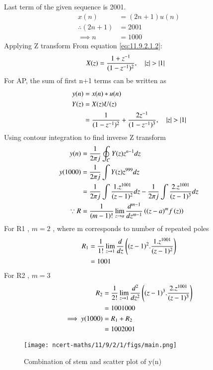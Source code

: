 \documentclass[journal,12pt,twocolumn]{IEEEtran}
\theoremstyle{remark}
\begin{document}
Last term of the given sequence is 2001.
\begin{align}
 x(n) &= (2n+1)u(n) \label{eq:11.9.2.1.2}\\
 \therefore ( 2n +1 ) &= 2001 \\
\implies n &= 1000 
\end{align}
Applying Z transform
From equation \eqref{eq:11.9.2.1.2}:
\begin{align}
   X(z) &= \frac{1+z^{-1}}{(1-z^{-1})^2},  \quad \left\vert z\right\vert > \left\vert1\right\vert  
\end{align}
For AP, the sum of first n+1 terms can be written as 
\begin{align}
y(n)&=x(n)*u(n) \\
Y(z) &= X(z)U(z)\\
 &=\frac{1}{(1-z^{-1})^2} + \frac{2z^{-1}}{(1-z^{-1})^3}, \quad \left\vert z\right\vert > \left\vert1\right\vert 
\end{align}
Using contour integration to find inverse Z transform
\begin{align}
y(n) &= \frac{1}{2\pi j} \oint_C Y(z) z^{n-1} dz\\
y(1000) &= \frac{1}{2\pi j}\int Y(z) z^{999} dz \\
 &= \frac{1}{2\pi j}\int \frac{1.z^{1001}}{(z-1)^{2}} dz - \frac{1}{2\pi j}\int \frac{2.z^{1001}}{(z-1)^{3}} dz\\
 \because R&=\frac{1}{\left(m-1\right)!}\lim\limits_{z\to a}\frac{d^{m-1}}{dz^{m-1}}\left({(z-a)}^{m}f\left(z\right)\right)
 \end{align}
 For R1 , $m = 2$ , where m corresponds to number of repeated poles \\
 \begin{align}
 R_1 &=\frac{1}{1!}\lim\limits_{z\to 1}\frac{d}{dz}\left((z-1)^2.\frac{1.z^{1001}}{(z-1)^{2}}\right)\\
 &= 1001
 \end{align}
 For R2 , $m = 3$ \\
 \begin{align}
 R_2 &=\frac{1}{2!}\lim\limits_{z\to 1}\frac{d^2}{dz^2}\left((z-1)^3.\frac{2.z^{1001}}{(z-1)^{3}}\right)\\
 &= 1001000\\
 \implies y(1000) &= R_1 + R_2 \\
&= 1002001
\end{align}

\begin{figure}[h!]
\centering
\texttt{[image: ncert-maths/11/9/2/1/figs/main.png]}
\label{fig:tans_plott}
\caption{Combination of stem and scatter plot of y(n)}
\end{figure}
\end{document}
